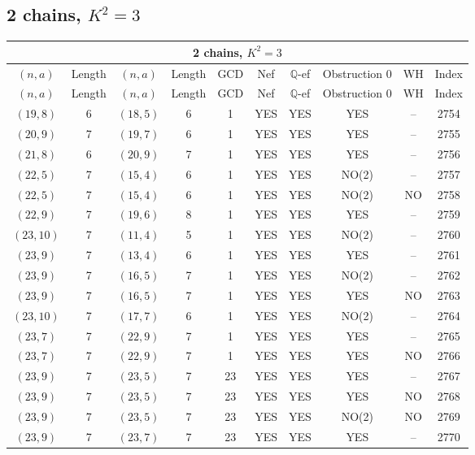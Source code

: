 \subsection{2 chains, $K^2 = 3$}
\begin{longtable}{|c|c|c|c|c|c|c|c|c|c|}
\hline
\multicolumn{10}{|c|}{2 chains, $K^2 = 3$}\\
\hline
$(n,a)$ & Length & $(n,a)$ & Length & GCD & Nef & $\mathbb Q$-ef & Obstruction 0 & WH & Index\\
\hline
\endfirsthead

\hline
$(n,a)$ & Length & $(n,a)$ & Length & GCD & Nef & $\mathbb Q$-ef & Obstruction 0 & WH & Index\\
\hline
\endhead
\hline
\endfoot

$(19, 8)$ & 6 & $(18, 5)$ & 6 & 1 & YES & YES & YES & -- & 2754\\
$(20, 9)$ & 7 & $(19, 7)$ & 6 & 1 & YES & YES & YES & -- & 2755\\
$(21, 8)$ & 6 & $(20, 9)$ & 7 & 1 & YES & YES & YES & -- & 2756\\
$(22, 5)$ & 7 & $(15, 4)$ & 6 & 1 & YES & YES & NO(2) & -- & 2757\\
$(22, 5)$ & 7 & $(15, 4)$ & 6 & 1 & YES & YES & NO(2) & NO & 2758\\
$(22, 9)$ & 7 & $(19, 6)$ & 8 & 1 & YES & YES & YES & -- & 2759\\
$(23, 10)$ & 7 & $(11, 4)$ & 5 & 1 & YES & YES & NO(2) & -- & 2760\\
$(23, 9)$ & 7 & $(13, 4)$ & 6 & 1 & YES & YES & YES & -- & 2761\\
$(23, 9)$ & 7 & $(16, 5)$ & 7 & 1 & YES & YES & NO(2) & -- & 2762\\
$(23, 9)$ & 7 & $(16, 5)$ & 7 & 1 & YES & YES & YES & NO & 2763\\
$(23, 10)$ & 7 & $(17, 7)$ & 6 & 1 & YES & YES & NO(2) & -- & 2764\\
$(23, 7)$ & 7 & $(22, 9)$ & 7 & 1 & YES & YES & YES & -- & 2765\\
$(23, 7)$ & 7 & $(22, 9)$ & 7 & 1 & YES & YES & YES & NO & 2766\\
$(23, 9)$ & 7 & $(23, 5)$ & 7 & 23 & YES & YES & YES & -- & 2767\\
$(23, 9)$ & 7 & $(23, 5)$ & 7 & 23 & YES & YES & YES & NO & 2768\\
$(23, 9)$ & 7 & $(23, 5)$ & 7 & 23 & YES & YES & NO(2) & NO & 2769\\
$(23, 9)$ & 7 & $(23, 7)$ & 7 & 23 & YES & YES & YES & -- & 2770\\

\end{longtable}
